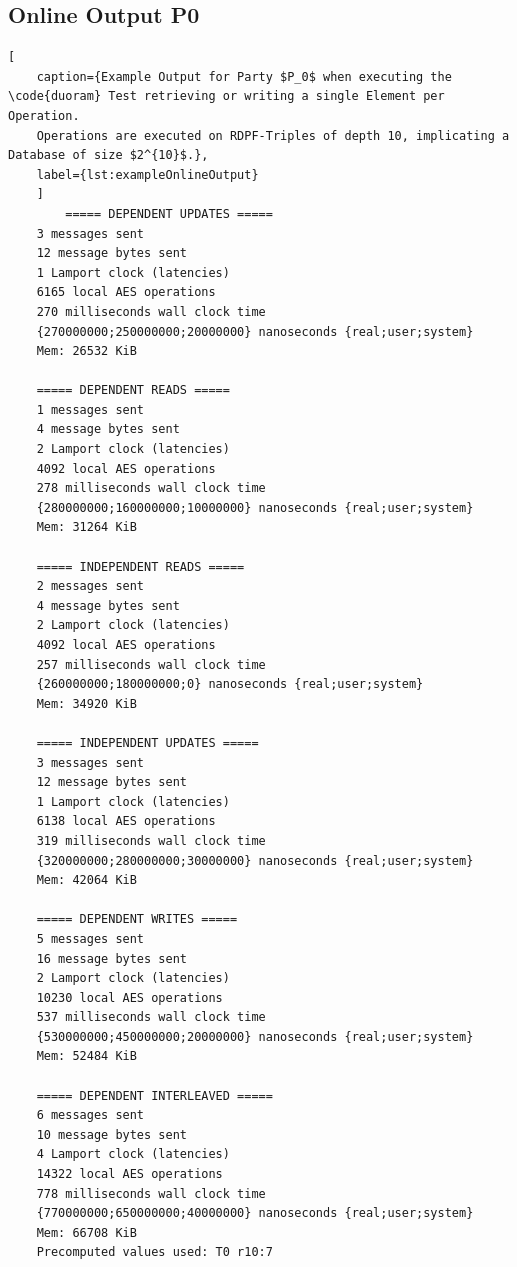 \subsection{Online Output P0}
\begin{lstlisting}[
    caption={Example Output for Party $P_0$ when executing the \code{duoram} Test retrieving or writing a single Element per Operation.
    Operations are executed on RDPF-Triples of depth 10, implicating a Database of size $2^{10}$.},
    label={lst:exampleOnlineOutput}
    ]
        ===== DEPENDENT UPDATES =====
    3 messages sent
    12 message bytes sent
    1 Lamport clock (latencies)
    6165 local AES operations
    270 milliseconds wall clock time
    {270000000;250000000;20000000} nanoseconds {real;user;system}
    Mem: 26532 KiB

    ===== DEPENDENT READS =====
    1 messages sent
    4 message bytes sent
    2 Lamport clock (latencies)
    4092 local AES operations
    278 milliseconds wall clock time
    {280000000;160000000;10000000} nanoseconds {real;user;system}
    Mem: 31264 KiB

    ===== INDEPENDENT READS =====
    2 messages sent
    4 message bytes sent
    2 Lamport clock (latencies)
    4092 local AES operations
    257 milliseconds wall clock time
    {260000000;180000000;0} nanoseconds {real;user;system}
    Mem: 34920 KiB

    ===== INDEPENDENT UPDATES =====
    3 messages sent
    12 message bytes sent
    1 Lamport clock (latencies)
    6138 local AES operations
    319 milliseconds wall clock time
    {320000000;280000000;30000000} nanoseconds {real;user;system}
    Mem: 42064 KiB

    ===== DEPENDENT WRITES =====
    5 messages sent
    16 message bytes sent
    2 Lamport clock (latencies)
    10230 local AES operations
    537 milliseconds wall clock time
    {530000000;450000000;20000000} nanoseconds {real;user;system}
    Mem: 52484 KiB

    ===== DEPENDENT INTERLEAVED =====
    6 messages sent
    10 message bytes sent
    4 Lamport clock (latencies)
    14322 local AES operations
    778 milliseconds wall clock time
    {770000000;650000000;40000000} nanoseconds {real;user;system}
    Mem: 66708 KiB
    Precomputed values used: T0 r10:7
\end{lstlisting}

